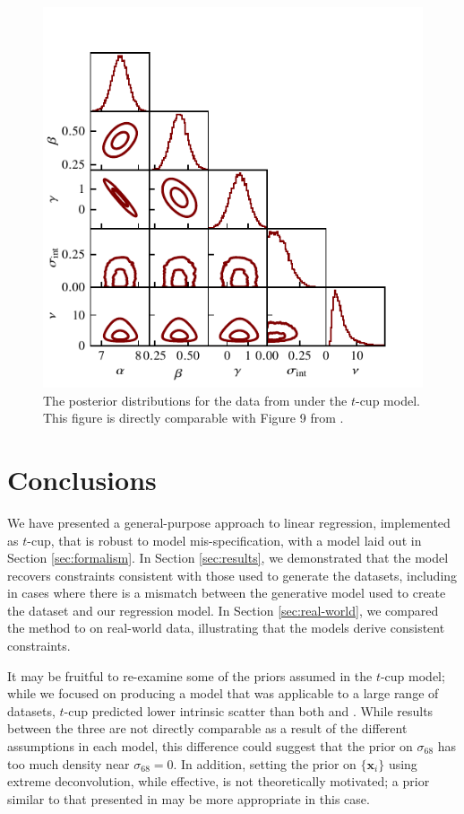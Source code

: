 \documentclass[fleqn,usenatbib]{rasti}
\begin{document}
\begin{figure}
    \includegraphics[width=\columnwidth]{graphics/real/corner_park_fwhm.pdf}
    \caption{The posterior distributions for the data from \citet{Park:2017}
    under the $t$-cup model. This figure is directly comparable with Figure 9 from \citet{Park:2017}.}
    \label{fig:real-world.park.corner}
\end{figure}

\section{Conclusions}
\label{sec:conclusion}

We have presented a general-purpose approach to linear regression, implemented
as $t$-cup, that is robust to model mis-specification, with a model laid out in
Section \ref{sec:formalism}. In Section \ref{sec:results}, we demonstrated that
the model recovers constraints consistent with those used to generate the
datasets, including in cases where there is a mismatch between the generative
model used to create the dataset and our regression model. In Section
\ref{sec:real-world}, we compared the method to \citet{Kelly:2007, Park:2017} on
real-world data, illustrating that the models derive consistent constraints.

It may be fruitful to re-examine some of the priors assumed in the $t$-cup
model; while we focused on producing a model that was applicable to a large
range of datasets, $t$-cup predicted lower intrinsic scatter than both
\citet{Kelly:2007} and \citet{Park:2017}. While results between the three are
not directly comparable as a result of the different assumptions in each model,
this difference could suggest that the prior on $\sigma_{68}$ has too much
density near $\sigma_{68} = 0$. In addition, setting the prior on
$\{\mathbf{x}_i\}$ using extreme deconvolution, while effective, is not
theoretically motivated; a prior similar to that presented in
\citet{Bartlett:2023} may be more appropriate in this case.
\end{document}
